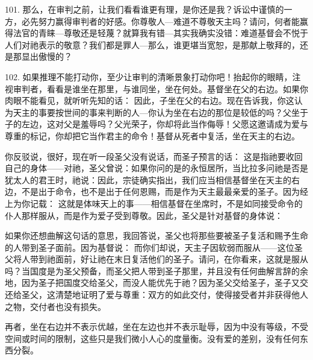 101. 那么，在审判之前，让我们看看谁更有理，是你还是我？诉讼中谨慎的一方，必先努力赢得审判者的好感。你尊敬人---难道不尊敬天主吗？请问，何者能赢得法官的青睐---尊敬还是轻蔑？就算我有错---其实我确实没错：难道基督会不悦于人们对祂表示的敬意？我们都是罪人---那么，谁更堪当宽恕，是那献上敬拜的，还是那显出傲慢的？\par

102. 如果推理不能打动你，至少让审判的清晰景象打动你吧！抬起你的眼睛，注视审判者，看看是谁坐在那里，与谁同坐，坐在何处。基督坐在父的右边。如果你肉眼不能看见，就听听先知的话： 因此，子坐在父的右边。现在告诉我，你这认为天主的事要按世间的事来判断的人---你认为坐在右边的那位是较低的吗？父坐于子的左边，这对父是羞辱吗？父光荣子，你却将此当作侮辱！父愿这邀请成为爱与尊重的标记，你却把它当作君主的命令！基督从死者中复活，坐在天主的右边。\par

你反驳说，很好，现在听一段圣父没有说话，而圣子预言的话： 这是指祂要收回自己的身体——对祂，圣父曾说：如果你问的是的永恒居所，当比拉多问祂是否是犹太人的君王时，祂说：因此，宗徒确实指出，我们应当相信基督坐在天主的右边，不是出于命令，也不是出于任何恩赐，而是作为天主最最亲爱的圣子。因为经上为你记载： 这就是体味天上的事——相信基督在坐席时，不是如同接受命令的仆人那样服从，而是作为爱子受到尊敬。因此，圣父是针对基督的身体说：\par

如果你还想曲解这句话的意思，我回答说，圣父也将那些要被圣子复活和赐予生命的人带到圣子面前。因为基督说： 而你们却说，天主子因软弱而服从——这位圣父将人带到祂面前，好让祂在末日复活他们的圣子。请问，在你看来，这就是服从吗？当国度是为圣父预备，而圣父把人带到圣子那里，并且没有任何曲解言辞的余地，因为圣子把国度交给圣父，而没人能优先于祂？因为圣父交给圣子，圣子又交还给圣父，这清楚地证明了爱与尊重：双方的如此交付，使得接受者并非获得他人之物，交付者也没有损失。\par

再者，坐在右边并不表示优越，坐在左边也并不表示耻辱，因为中没有等级，不受空间或时间的限制，这些只是我们微小人心的度量衡。没有爱的差别，没有任何东西分裂。\par

